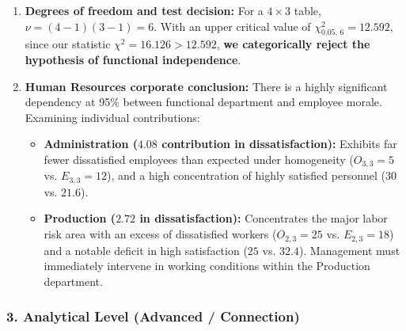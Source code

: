 \begin{solproblema}
\begin{enumerate}
		\item \textbf{Degrees of freedom and test decision:}
		For a $4 \times 3$ table, $\nu = (4-1)(3-1) = 6$.
		With an upper critical value of $\chi^2_{0.05, \, 6} = 12.592$, since our statistic $\chi^2 = 16.126 > 12.592$, \textbf{we categorically reject the hypothesis of functional independence}.
		
		\item \textbf{Human Resources corporate conclusion:}
		There is a highly significant dependency at 95\% between functional department and employee morale. Examining individual contributions:
		\begin{itemize}
			\item \textbf{Administration ($4.08$ contribution in dissatisfaction):} Exhibits far fewer dissatisfied employees than expected under homogeneity ($O_{3,3} = 5$ vs. $E_{3,3} = 12$), and a high concentration of highly satisfied personnel ($30$ vs. $21.6$).
			\item \textbf{Production ($2.72$ in dissatisfaction):} Concentrates the major labor risk area with an excess of dissatisfied workers ($O_{2,3} = 25$ vs. $E_{2,3} = 18$) and a notable deficit in high satisfaction ($25$ vs. $32.4$). Management must immediately intervene in working conditions within the Production department.
		\end{itemize}
	\end{enumerate}
\end{solproblema}

\subsubsection*{3. Analytical Level (Advanced / Connection)}

